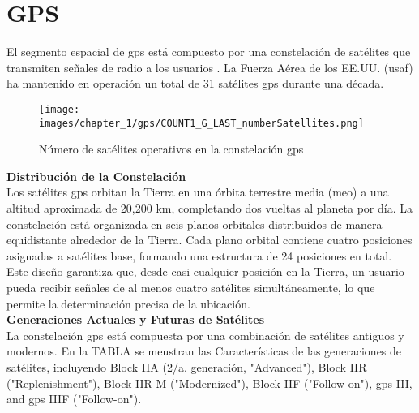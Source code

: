 \section{GPS}
\label{sec:gps}

\renewcommand{\thetable}{2}

\begin{justify}
    El segmento espacial de \gls{gps} está compuesto por una constelación de satélites que transmiten señales de radio a los usuarios \parencite{gpsgov}.
    La Fuerza Aérea de los EE.UU. (\gls{usaf}) ha mantenido en operación un total de 31 satélites \gls{gps} durante una década.\\

    \begin{figure}[H]
        \centering
        \texttt{[image: images/chapter\_1/gps/COUNT1\_G\_LAST\_numberSatellites.png]}
        \caption{Número de satélites operativos en la constelación \gls{gps}}
        \label{fig:gps_numSatellites}
    \end{figure}

    \noindent\textbf{Distribución de la Constelación}\\
    Los satélites \gls{gps} orbitan la Tierra en una órbita terrestre media (\gls{meo}) a una altitud aproximada de 20,200 km, completando
    dos vueltas al planeta por día. La constelación está organizada en seis planos orbitales distribuidos de manera equidistante alrededor
    de la Tierra. Cada plano orbital contiene cuatro posiciones asignadas a satélites base, formando una estructura de 24 posiciones en total.
    Este diseño garantiza que, desde casi cualquier posición en la Tierra, un usuario pueda recibir señales de al menos cuatro satélites simultáneamente,
    lo que permite la determinación precisa de la ubicación.\\

    \noindent\textbf{Generaciones Actuales y Futuras de Satélites}\\
    La constelación \gls{gps} está compuesta por una combinación de satélites antiguos y modernos. En la TABLA se meustran las Características de las
    generaciones de satélites, incluyendo Block IIA (2/a. generación, "Advanced"), Block IIR ("Replenishment"), Block IIR-M ("Modernized"), Block IIF ("Follow-on"),
    \gls{gps} III, and \gls{gps} IIIF ("Follow-on").
\end{justify}

